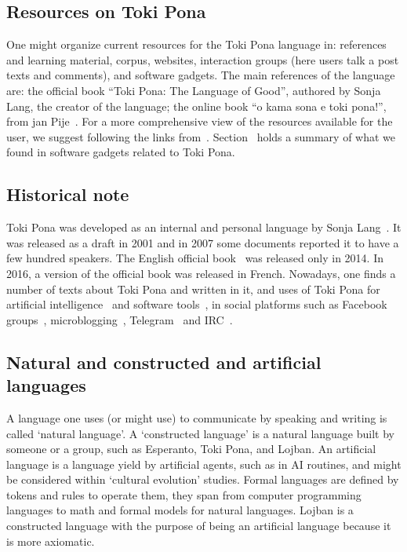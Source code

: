 \documentclass{article}
\begin{document}

\subsection{Resources on Toki Pona}
One might organize current resources for the Toki Pona
language in: references and learning material, corpus,
websites, interaction groups (here users talk a post texts and comments), and software gadgets.
The main references of the language are:
  the official book ``Toki Pona: The Language of Good'',
    authored by Sonja Lang, the creator of the language;
the online book ``o kama sona e toki pona!'',
from jan Pije~\cite{kama}.
For a more comprehensive view of the resources available
for the user, we suggest following the links 
from~\cite{wikiToki}.
Section~\cite{third} holds a summary of what we found in software
gadgets related to Toki Pona.

\subsection{Historical note}
Toki Pona was developed as an internal and personal language
by Sonja Lang~\cite{interview}.
It was released as a draft in 2001 and in 2007 some documents
reported it to have a few hundred speakers.
The English official book~\cite{lipu} was released only in 2014.
In 2016, a version of the official book was released in French.
Nowadays, one finds a number of texts about Toki Pona and written
in it, and uses of Toki Pona for artificial intelligence~\cite{roila}
and software tools~\cite{tptoll1,tptool2,tptool3},
in social platforms such as Facebook groups~\cite{fbtp,fbtpt},
microblogging~\cite{tokilili}, Telegram~\cite{telegram} and IRC~\cite{irc}.

\subsection{Natural and constructed and artificial languages}
A language one uses (or might use) to communicate by speaking
and writing is called `natural language'.
A `constructed language' is a natural language built by someone or
a group, such as Esperanto, Toki Pona, and Lojban.
An artificial language is a language yield by artificial agents,
such as in AI routines, and might be considered
within `cultural evolution' studies.
Formal languages are defined by tokens and rules to
operate them, they span from computer programming languages
to math and formal models for natural languages.
Lojban is a constructed language with the purpose of being
an artificial language because it is more axiomatic.
\end{document}
